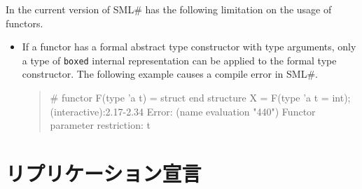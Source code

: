 \documentclass{jbook}
\newcommand{\txt}[2]{#1}
\newcommand{\smlsharp}{SML\#}
\newenvironment{program}{\begin{quote}\begin{tt}}%
                        {\end{tt}\end{quote}}
\begin{document}
	In the current version of \smlsharp{} has the following limitation
on the usage of functors.
\begin{itemize}
\item
	If a functor has a formal abstract type constructor with type
arguments, only a type of {\tt boxed} internal representation can be
applied to the formal type constructor.
	The following example causes a compile error in \smlsharp{}.
\begin{program}
\# functor F(type 'a t) = struct end
   structure X = F(type 'a t = int);
(interactive):2.17-2.34 Error:
  (name evaluation "440") Functor parameter restriction: t
\end{program}
\end{itemize}

\fi%


\section{\txt{リプリケーション宣言}{Replications}}
\label{sec:tutorialReplicationInInterface}
\end{document}
